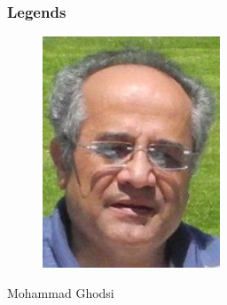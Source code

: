 \documentclass{../c-lecture}
\begin{document}
\begin{frame}
  \frametitle{Legends}
  \begin{figure}
    \includegraphics[height=.75\textheight]{./img/ghodsi.jpg}
  \end{figure}
  \pause%
  \centering
  \color{Violet} Mohammad Ghodsi
\end{frame}
\end{document}

